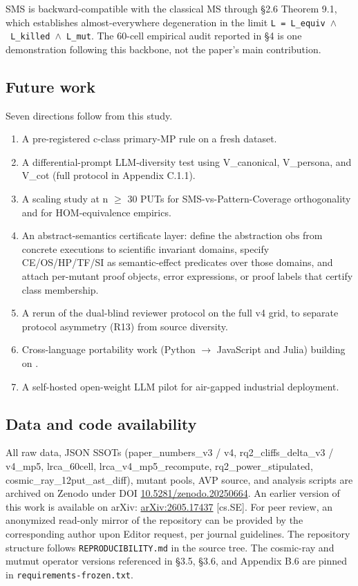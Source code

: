 \documentclass[manuscript,screen,review]{acmart}
\begin{document}
SMS is backward-compatible with the classical MS through §2.6 Theorem
9.1, which establishes almost-everywhere degeneration in the limit
\texttt{L\ =\ L\_equiv\ $\wedge$\ L\_killed\ $\wedge$\ L\_mut}. The 60-cell empirical
audit reported in §4 is one demonstration following this backbone, not
the paper's main contribution.

\subsection{Future work}\label{future-work-and-p-series-roadmap}

Seven directions follow from this study.

\begin{enumerate}[label=(\alph*)]
\item
  A pre-registered c-class primary-MP rule on a fresh dataset.
\item
  A differential-prompt LLM-diversity test using V\_canonical,
  V\_persona, and V\_cot (full protocol in Appendix C.1.1).
\item
  A scaling study at n $\geq$ 30 PUTs for SMS-vs-Pattern-Coverage
  orthogonality and for HOM-equivalence empirics.
\item
  An abstract-semantics certificate layer: define the abstraction
  $\mathrm{obs}$ from concrete executions to scientific invariant domains,
  specify CE/OS/HP/TF/SI as semantic-effect predicates over those
  domains, and attach per-mutant proof objects, error expressions, or
  proof labels that certify class membership.
\item
  A rerun of the dual-blind reviewer protocol on the full v4 grid, to
  separate protocol asymmetry (R13) from source diversity.
\item
  Cross-language portability work (Python $\to$ JavaScript and Julia)
  building on \citet{tip2025llmorpheus}.
\item
  A self-hosted open-weight LLM pilot for air-gapped industrial
  deployment.
\end{enumerate}


\subsection{Data and code availability}\label{data-and-code-availability}

All raw data, JSON SSOTs (paper\_numbers\_v3 / v4,
rq2\_cliffs\_delta\_v3 / v4\_mp5, lrca\_60cell,
lrca\_v4\_mp5\_recompute, rq2\_power\_stipulated,
cosmic\_ray\_12put\_ast\_diff), mutant pools, AVP source, and analysis
scripts are archived on Zenodo under DOI
\href{https://doi.org/10.5281/zenodo.20250664}{10.5281/zenodo.20250664}.
An earlier version of this work is available on arXiv:
\href{https://arxiv.org/abs/2605.17437}{arXiv:2605.17437} [cs.SE].
For peer review, an anonymized read-only mirror of the repository can
be provided by the corresponding author upon Editor request, per journal
guidelines. The repository structure follows
\texttt{REPRODUCIBILITY.md} in the source tree. The cosmic-ray and
mutmut operator versions referenced in §3.5, §3.6, and Appendix B.6 are
pinned in \texttt{requirements-frozen.txt}.
\end{document}
